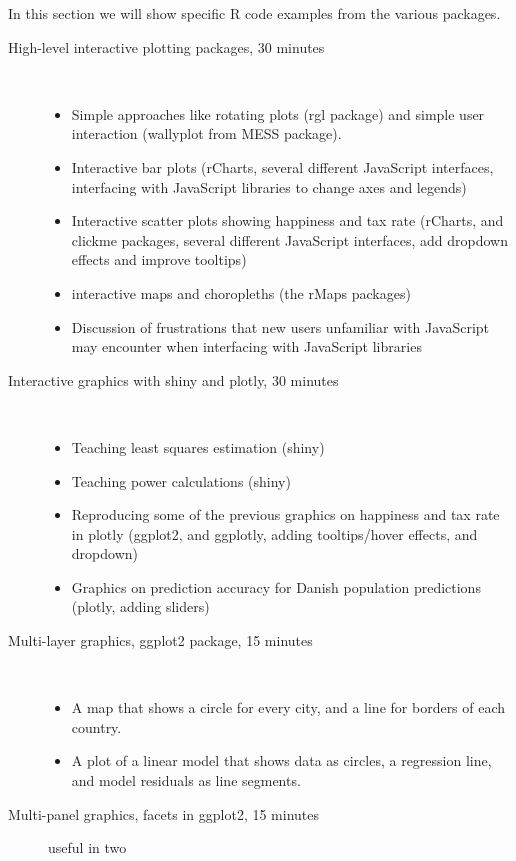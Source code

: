 \documentclass[11pt]{article}
\begin{document}
In this section we will show specific R code examples from the various
packages.

\begin{description}
\item[{High-level interactive plotting packages, 30 minutes}] \mbox{ }

\begin{itemize}
\item Simple approaches like rotating plots (rgl package) and simple user
interaction (wallyplot from MESS package).
\item Interactive bar plots (rCharts, several different JavaScript
interfaces, interfacing with JavaScript libraries to change axes
and legends)
\item Interactive scatter plots showing happiness and tax rate (rCharts,
and clickme packages, several different JavaScript interfaces, add
dropdown effects and improve tooltips)
\item interactive maps and choropleths (the rMaps packages)
\item Discussion of frustrations that new users unfamiliar with
JavaScript may encounter when interfacing with JavaScript libraries
\end{itemize}
\item[{Interactive graphics with shiny and plotly, 30 minutes}] \mbox{ }
\begin{itemize}
\item Teaching least squares estimation (shiny)
\item Teaching power calculations (shiny)
\item Reproducing some of the previous graphics on happiness and tax
rate in plotly (ggplot2, and ggplotly, adding tooltips/hover
effects, and dropdown)
\item Graphics on prediction accuracy for Danish population predictions
(plotly, adding sliders)
\end{itemize}
\item[{Multi-layer graphics, ggplot2 package, 15 minutes}] \mbox{ }
\begin{itemize}
\item A map that shows a circle for every city, and a line for borders of
each country.
\item A plot of a linear model that shows data as circles, a regression
line, and model residuals as line segments.
\end{itemize}
\item[{Multi-panel graphics, facets in ggplot2, 15 minutes}] useful in two

\end{description}
\end{document}
